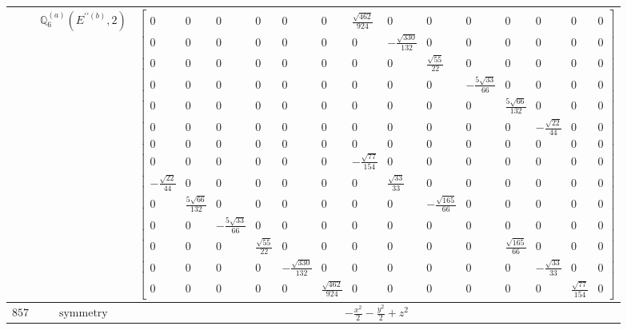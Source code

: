 \documentclass[fleqn,8pt,landscape]{jsarticle}
\begin{document}
\begin{longtable}{ccc}
$  $ & $ \mathbb{Q}_{6}^{(a)}(E^{\prime\prime(b)},2) $ & $ \begin{bmatrix} 0 & 0 & 0 & 0 & 0 & 0 & \frac{\sqrt{462}}{924} & 0 & 0 & 0 & 0 & 0 & 0 & 0 \\ 0 & 0 & 0 & 0 & 0 & 0 & 0 & - \frac{\sqrt{330}}{132} & 0 & 0 & 0 & 0 & 0 & 0 \\ 0 & 0 & 0 & 0 & 0 & 0 & 0 & 0 & \frac{\sqrt{55}}{22} & 0 & 0 & 0 & 0 & 0 \\ 0 & 0 & 0 & 0 & 0 & 0 & 0 & 0 & 0 & - \frac{5 \sqrt{33}}{66} & 0 & 0 & 0 & 0 \\ 0 & 0 & 0 & 0 & 0 & 0 & 0 & 0 & 0 & 0 & \frac{5 \sqrt{66}}{132} & 0 & 0 & 0 \\ 0 & 0 & 0 & 0 & 0 & 0 & 0 & 0 & 0 & 0 & 0 & - \frac{\sqrt{22}}{44} & 0 & 0 \\ 0 & 0 & 0 & 0 & 0 & 0 & 0 & 0 & 0 & 0 & 0 & 0 & 0 & 0 \\ 0 & 0 & 0 & 0 & 0 & 0 & - \frac{\sqrt{77}}{154} & 0 & 0 & 0 & 0 & 0 & 0 & 0 \\ - \frac{\sqrt{22}}{44} & 0 & 0 & 0 & 0 & 0 & 0 & \frac{\sqrt{33}}{33} & 0 & 0 & 0 & 0 & 0 & 0 \\ 0 & \frac{5 \sqrt{66}}{132} & 0 & 0 & 0 & 0 & 0 & 0 & - \frac{\sqrt{165}}{66} & 0 & 0 & 0 & 0 & 0 \\ 0 & 0 & - \frac{5 \sqrt{33}}{66} & 0 & 0 & 0 & 0 & 0 & 0 & 0 & 0 & 0 & 0 & 0 \\ 0 & 0 & 0 & \frac{\sqrt{55}}{22} & 0 & 0 & 0 & 0 & 0 & 0 & \frac{\sqrt{165}}{66} & 0 & 0 & 0 \\ 0 & 0 & 0 & 0 & - \frac{\sqrt{330}}{132} & 0 & 0 & 0 & 0 & 0 & 0 & - \frac{\sqrt{33}}{33} & 0 & 0 \\ 0 & 0 & 0 & 0 & 0 & \frac{\sqrt{462}}{924} & 0 & 0 & 0 & 0 & 0 & 0 & \frac{\sqrt{77}}{154} & 0 \end{bmatrix} $ \\ \hline
$ 857 $ & $ \text{symmetry} $ & $ - \frac{x^{2}}{2} - \frac{y^{2}}{2} + z^{2} $ \\

\end{longtable}
\end{document}
